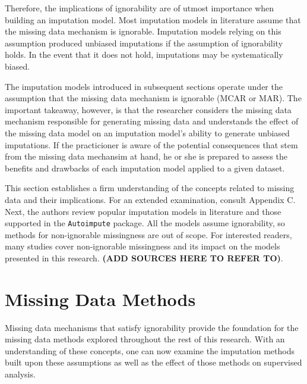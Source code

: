 \documentclass[12pt,oneside]{chicagocapstone}
\begin{document}
Therefore, the implications of ignorability are of utmost importance
when building an imputation model. Most imputation models in literature
assume that the missing data mechanism is ignorable. Imputation models
relying on this assumption produced unbiased imputations if the
assumption of ignorability holds. In the event that it does not hold,
imputations may be systematically biased.

The imputation models introduced in subsequent sections operate under
the assumption that the missing data mechanism is ignorable (MCAR or
MAR). The important takeaway, however, is that the researcher considers
the missing data mechanism responsible for generating missing data and
understands the effect of the missing data model on an imputation
model's ability to generate unbiased imputations. If the practicioner is
aware of the potential consequences that stem from the missing data
mechansim at hand, he or she is prepared to assess the benefits and
drawbacks of each imputation model applied to a given dataset.

This section establishes a firm understanding of the concepts related to
missing data and their implications. For an extended examination,
consult Appendix C. Next, the authors review popular imputation models
in literature and those supported in the \texttt{Autoimpute} package.
All the models assume ignorability, so methods for non-ignorable
missingness are out of scope. For interested readers, many studies cover
non-ignorable missingness and its impact on the models presented in this
research. \textbf{(ADD SOURCES HERE TO REFER TO)}.

\section*{Missing Data Methods}\label{background-missing-data-methods}

Missing data mechanisms that satisfy ignorability provide the foundation
for the missing data methods explored throughout the rest of this
research. With an understanding of these concepts, one can now examine
the imputation methods built upon these assumptions as well as the
effect of those methods on supervised analysis.
\end{document}
